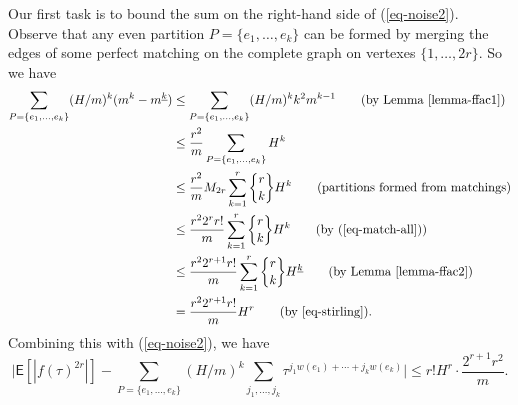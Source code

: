 \documentclass[14pt]{extarticle}
\def\EXP{\mathsf{E}}
\begin{document}
Our first task is to bound the sum on the right-hand side of
(\ref{eq-noise2}).
Observe
that any even partition $P = \{e_1, \ldots, e_k\}$ 
can be formed by merging the edges 
of some perfect matching  on the complete graph on 
vertexes $\{1, \ldots, 2r\}$.
So we have
\begin{align*}
\sum_{P = \{e_1, \ldots, e_k\}} (H/m)^k (m^k - m^{\underline{k}}) 
   & \le  \sum_{P = \{e_1, \ldots, e_k\}} (H/m)^k k^2 m^{k-1}
          \qquad \text{(by Lemma~\ref{lemma-ffac1})} \\
   & \le \frac{r^2}{m} \sum_{P = \{e_1, \ldots, e_k\}} H^k \\
   & \le \frac{r^2}{m} M_{2r} \sum_{k=1}^r {r \brace k} H^k
          \qquad \text{(partitions formed from matchings)}  \\
   & \le \frac{r^2 2^r r!}{m}  \sum_{k=1}^r {r \brace k} H^k
           \qquad \text{(by (\ref{eq-match-all}))} \\
   & \le \frac{r^2 2^{r+1} r!}{m} \sum_{k=1}^r {r \brace k} H^{\underline{k}} 
           \qquad \text{(by Lemma~\ref{lemma-ffac2})} \\
   & = \frac{r^2 2^{r+1} r!}{m} H^r
          \qquad \text{(by \ref{eq-stirling})} .
\end{align*}
Combining this with (\ref{eq-noise2}), we have 
\begin{equation}
\label{eq-noise3}
\biggl| \EXP[|f(\tau)^{2r}|] - \sum_{P = \{e_1, \ldots, e_k\}} (H/m)^k 
   \sum_{j_1, \ldots, j_k} \tau^{j_1 w(e_1) + \cdots + j_k w(e_k)}  \biggr|
\le r! H^r \cdot \frac{2^{r+1} r^2}{m} .
\end{equation}
\end{document}

